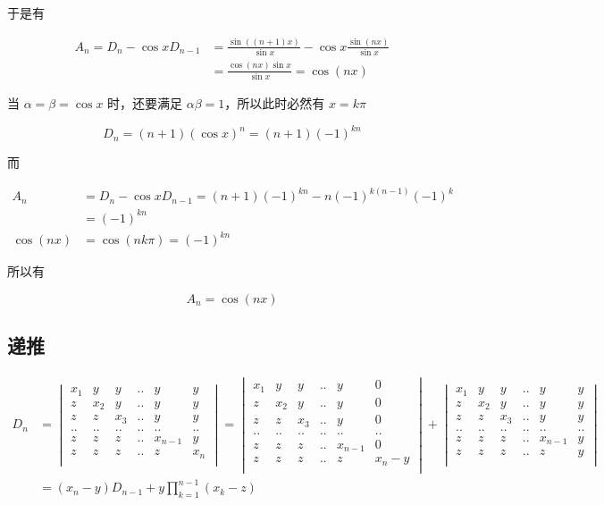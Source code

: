 \documentclass[12pt,a4paper]{ctexart}
\begin{document}
于是有

\begin{align*}
A_n = D_n - \cos x D_{n-1} &= \frac{\sin ((n+1)x)}{\sin x} - \cos x \frac{\sin (nx)}{\sin x} \\
&= \frac{\cos (nx) \sin x}{\sin x} = \cos (nx)
\end{align*}

当 $\alpha = \beta = \cos x$ 时，还要满足 $\alpha \beta = 1$，所以此时必然有 $x = k \pi$

\[
D_n = (n+1)(\cos x)^n = (n+1)(-1)^{kn}
\]

而

\begin{align*}
    A_n &= D_n - \cos x D_{n-1} = (n+1)(-1)^{kn} - n(-1)^{k(n-1)}(-1)^k \\
    &= (-1)^{kn} \\
    \cos (nx) &= \cos (n k \pi) = (-1)^{kn}
\end{align*}

所以有

\[
A_n = \cos (nx)
\]

\subsection{递推}

\begin{align*}
    D_n &= \begin{vmatrix}
        x_1 & y & y & .. & y & y \\
        z & x_2 & y & .. & y & y \\
        z & z & x_3 & .. & y & y \\
        .. & .. &.. &.. &.. & .. \\
        z & z & z &.. & x_{n-1} & y \\
        z & z & z &.. & z & x_n \\
    \end{vmatrix} = \begin{vmatrix}
        x_1 & y & y & .. & y & 0 \\
        z & x_2 & y & .. & y & 0 \\
        z & z & x_3 & .. & y & 0 \\
        .. & .. &.. &.. &.. & .. \\
        z & z & z &.. & x_{n-1} & 0 \\
        z & z & z &.. & z & x_n - y\\
    \end{vmatrix} + \begin{vmatrix}
        x_1 & y & y & .. & y & y \\
        z & x_2 & y & .. & y & y \\
        z & z & x_3 & .. & y & y \\
        .. & .. &.. &.. &.. & .. \\
        z & z & z &.. & x_{n-1} & y \\
        z & z & z &.. & z & y \\
    \end{vmatrix} \\
    &= (x_n - y)D_{n-1} + y\prod_{k=1}^{n-1}(x_k - z)
\end{align*}
\end{document}
